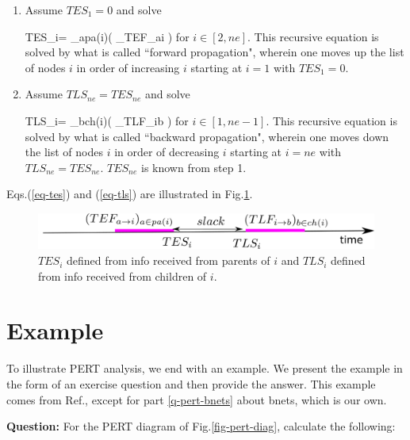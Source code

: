 \begin{enumerate}
\item Assume $TES_1=0$ and solve

\beq
TES_i= \max_{a\in pa(i)}(
_{TEF_{a\rarrow i}}
)
\;
\label{eq-tes}
\eeq
for $i\in [2, ne]$.
This recursive equation is solved
by what is called
``forward propagation",
wherein one 
moves up the list of
nodes $i$ in order 
of increasing 
$i$
starting at $i=1$ with $TES_1=0$.

\item Assume $TLS_{ne}=TES_{ne}$ and solve

\beq
TLS_i= \min_{b\in ch(i)}(
_{TLF_{i\rarrow b}}
)
\;
\label{eq-tls}
\eeq
for $i\in [1, ne-1]$. This recursive
equation is solved
by what is called
``backward propagation",
wherein one 
moves down the list of
nodes $i$ in order 
of decreasing 
$i$
starting at $i=ne$ with $TLS_{ne}=TES_{ne}$.
$TES_{ne}$ is known from step 1.
\end{enumerate}
Eqs.(\ref{eq-tes}) and (\ref{eq-tls})
are illustrated in Fig.\ref{fig-pert-t-interval}.



\begin{figure}[h!]
\centering
\includegraphics[width=6in]{pert/pert.png}
\caption{
$TES_i$ 
defined from info received
from parents of  $i$
and  $TLS_i$
defined from info received 
from children of $i$.} 
\label{fig-pert-t-interval}
\end{figure}
\section*{Example}
To illustrate PERT analysis, we end 
with an example. We present the 
example
in the form of an exercise question and then
provide the answer. This example
comes from Ref.\cite{ibook},
except for part \ref{q-pert-bnets} 
about bnets, which is our own.

{\bf Question:}
For the PERT diagram of Fig.\ref{fig-pert-diag},
calculate the following:


